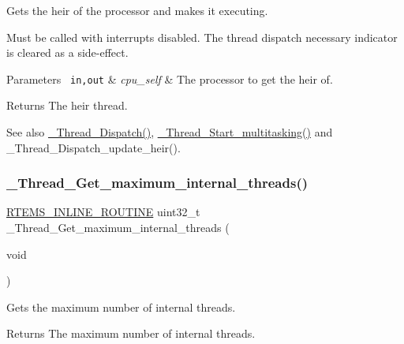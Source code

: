 Gets the heir of the processor and makes it executing. 

Must be called with interrupts disabled. The thread dispatch necessary indicator is cleared as a side-\/effect.


\begin{DoxyParams}[1]{Parameters}
\mbox{\texttt{ in,out}}  & {\em cpu\+\_\+self} & The processor to get the heir of.\\
\hline
\end{DoxyParams}
\begin{DoxyReturn}{Returns}
The heir thread.
\end{DoxyReturn}
\begin{DoxySeeAlso}{See also}
\mbox{\hyperlink{group__RTEMSScoreThread_ga14e949c0f400cda43b1e7547e50b088d}{\+\_\+\+Thread\+\_\+\+Dispatch()}}, \mbox{\hyperlink{group__RTEMSScoreThread_gab27215302814d0aa0ec3306b165ea247}{\+\_\+\+Thread\+\_\+\+Start\+\_\+multitasking()}} and \+\_\+\+Thread\+\_\+\+Dispatch\+\_\+update\+\_\+heir(). 
\end{DoxySeeAlso}
\mbox{\label{group__RTEMSScoreThread_ga7bbab15663bd69884801378fdeaed47b}} 
\subsubsection{\texorpdfstring{\_Thread\_Get\_maximum\_internal\_threads()}{\_Thread\_Get\_maximum\_internal\_threads()}}
{\footnotesize\ttfamily \mbox{\hyperlink{group__RTEMSScoreBaseDefs_gac216239df231d5dbd15e3520b0b9313f}{R\+T\+E\+M\+S\+\_\+\+I\+N\+L\+I\+N\+E\+\_\+\+R\+O\+U\+T\+I\+NE}} uint32\+\_\+t \+\_\+\+Thread\+\_\+\+Get\+\_\+maximum\+\_\+internal\+\_\+threads (\begin{DoxyParamCaption}\item[{void}]{ }\end{DoxyParamCaption})}



Gets the maximum number of internal threads. 

\begin{DoxyReturn}{Returns}
The maximum number of internal threads. 
\end{DoxyReturn}
\mbox{\label{group__RTEMSScoreThread_ga590ea63fba22ecee184711c5d2a98227}} 
